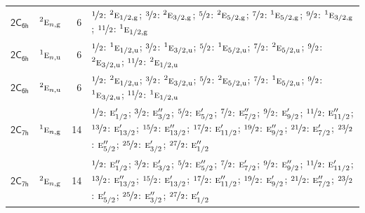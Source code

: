 \documentclass[10pt,a4paper]{article}
\numberwithin{equation}{section}
\newcommand{\grp}[1]{\mathsf{#1}}
\newcommand{\irr}[1]{\text{\normalfont\scshape #1}}
\newcommand{\conjpair}[1]{{}^{#1}}
\newcommand{\ptag}[1]{\mathrm{#1}}
\newlength{\fillwidth}\newlength{\cellwidth}\newlength{\colwidth}
\begin{document}
{\begin{longtable}{@{}llr>{\RaggedRight\arraybackslash}p{\fillwidth}@{}}
\href{2C6h.pdf}{$\grp{2C_{6h}}$} & $\conjpair{2}\irr{e}_{n,\ptag{g}}$ & 6 & $\nicefrac{1}{2}$: $\conjpair{2}\irr{e}_{1/2,\ptag{g}}$; $\nicefrac{3}{2}$: $\conjpair{2}\irr{e}_{3/2,\ptag{g}}$; $\nicefrac{5}{2}$: $\conjpair{2}\irr{e}_{5/2,\ptag{g}}$; $\nicefrac{7}{2}$: $\conjpair{1}\irr{e}_{5/2,\ptag{g}}$; $\nicefrac{9}{2}$: $\conjpair{1}\irr{e}_{3/2,\ptag{g}}$; $\nicefrac{11}{2}$: $\conjpair{1}\irr{e}_{1/2,\ptag{g}}$\\
\href{2C6h.pdf}{$\grp{2C_{6h}}$} & $\conjpair{1}\irr{e}_{n,\ptag{u}}$ & 6 & $\nicefrac{1}{2}$: $\conjpair{1}\irr{e}_{1/2,\ptag{u}}$; $\nicefrac{3}{2}$: $\conjpair{1}\irr{e}_{3/2,\ptag{u}}$; $\nicefrac{5}{2}$: $\conjpair{1}\irr{e}_{5/2,\ptag{u}}$; $\nicefrac{7}{2}$: $\conjpair{2}\irr{e}_{5/2,\ptag{u}}$; $\nicefrac{9}{2}$: $\conjpair{2}\irr{e}_{3/2,\ptag{u}}$; $\nicefrac{11}{2}$: $\conjpair{2}\irr{e}_{1/2,\ptag{u}}$\\
\href{2C6h.pdf}{$\grp{2C_{6h}}$} & $\conjpair{2}\irr{e}_{n,\ptag{u}}$ & 6 & $\nicefrac{1}{2}$: $\conjpair{2}\irr{e}_{1/2,\ptag{u}}$; $\nicefrac{3}{2}$: $\conjpair{2}\irr{e}_{3/2,\ptag{u}}$; $\nicefrac{5}{2}$: $\conjpair{2}\irr{e}_{5/2,\ptag{u}}$; $\nicefrac{7}{2}$: $\conjpair{1}\irr{e}_{5/2,\ptag{u}}$; $\nicefrac{9}{2}$: $\conjpair{1}\irr{e}_{3/2,\ptag{u}}$; $\nicefrac{11}{2}$: $\conjpair{1}\irr{e}_{1/2,\ptag{u}}$\\
\href{2C7h.pdf}{$\grp{2C_{7h}}$} & $\conjpair{1}\irr{e}_{n,\ptag{g}}$ & 14 & $\nicefrac{1}{2}$: $\irr{e}_{1/2}'$; $\nicefrac{3}{2}$: $\irr{e}_{3/2}''$; $\nicefrac{5}{2}$: $\irr{e}_{5/2}'$; $\nicefrac{7}{2}$: $\irr{e}_{7/2}''$; $\nicefrac{9}{2}$: $\irr{e}_{9/2}'$; $\nicefrac{11}{2}$: $\irr{e}_{11/2}''$; $\nicefrac{13}{2}$: $\irr{e}_{13/2}'$; $\nicefrac{15}{2}$: $\irr{e}_{13/2}''$; $\nicefrac{17}{2}$: $\irr{e}_{11/2}'$; $\nicefrac{19}{2}$: $\irr{e}_{9/2}''$; $\nicefrac{21}{2}$: $\irr{e}_{7/2}'$; $\nicefrac{23}{2}$: $\irr{e}_{5/2}''$; $\nicefrac{25}{2}$: $\irr{e}_{3/2}'$; $\nicefrac{27}{2}$: $\irr{e}_{1/2}''$\\
\href{2C7h.pdf}{$\grp{2C_{7h}}$} & $\conjpair{2}\irr{e}_{n,\ptag{g}}$ & 14 & $\nicefrac{1}{2}$: $\irr{e}_{1/2}''$; $\nicefrac{3}{2}$: $\irr{e}_{3/2}'$; $\nicefrac{5}{2}$: $\irr{e}_{5/2}''$; $\nicefrac{7}{2}$: $\irr{e}_{7/2}'$; $\nicefrac{9}{2}$: $\irr{e}_{9/2}''$; $\nicefrac{11}{2}$: $\irr{e}_{11/2}'$; $\nicefrac{13}{2}$: $\irr{e}_{13/2}''$; $\nicefrac{15}{2}$: $\irr{e}_{13/2}'$; $\nicefrac{17}{2}$: $\irr{e}_{11/2}''$; $\nicefrac{19}{2}$: $\irr{e}_{9/2}'$; $\nicefrac{21}{2}$: $\irr{e}_{7/2}''$; $\nicefrac{23}{2}$: $\irr{e}_{5/2}'$; $\nicefrac{25}{2}$: $\irr{e}_{3/2}''$; $\nicefrac{27}{2}$: $\irr{e}_{1/2}'$\\

\end{longtable}}
\end{document}
